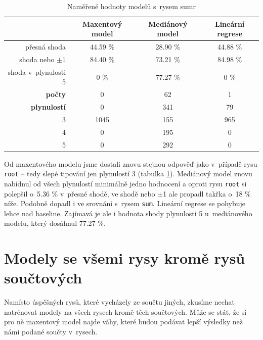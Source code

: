 \documentclass[12pt,a4paper]{report}
\begin{document}
\begin{table}[!htbp]
\begin{center}
\begin{tabular}{|r|c|c|c|}
\hline
 & \textbf{\scriptsize{ Maxentový model}} & \textbf{\scriptsize Mediánový model} & \textbf{\scriptsize Lineární regrese} \\
 \hline
 přesná shoda & 44.59 \%  & 28.90 \%  & 44.88 \% \\
\hline
shoda nebo $\pm$1 & 84.40 \% & 73.21 \%  & 84.98 \% \\
\hline
shoda v~plynulosti 5 & \color{red}0 \% & 77.27 \% & \color{red}0 \% \\
\hline
     \textbf{počty} \quad 1 & \color{red}0   & 62  & 1 \\
\textbf{plynulostí} \quad 2 & \color{red}0 & 341   & 79\\
                          3 & 1045 & 155  & 965\\
                          4 & \color{red}0   & 195 & \color{red}0 \\
                          5 & \color{red}0   & 292 & \color{red}0 \\
\hline
\end{tabular}
\caption{Naměřené hodnoty modelů s~rysem sumr}\label{tb:sumr}
\end{center}
\end{table}

Od maxentového modelu jsme dostali znovu stejnou odpověď jako v~případě rysu \texttt{root} -- tedy slepé tipování jen plynulostí 3 (tabulka \ref{tb:sumr}). Mediánový model znovu nabídnul od všech plynulostí minimálně jedno hodnocení a oproti rysu \texttt{root} si polepšil o~5.36 \% v~přesné shodě, ve shodě nebo $\pm$1 ale propadl takřka o~18 \% níže. Podobně dopadl i ve srovnání s~rysem \texttt{sum}. Lineární regrese se pohybuje lehce nad baseline. Zajímavá je ale i hodnota shody plynulosti 5 u~mediánového modelu, který dosáhnul 77.27 \%.



\section{Modely se všemi rysy kromě rysů součtových}
Namísto úspěšných rysů, které vycházely ze součtu jiných, zkusíme nechat natrénovat modely na všech rysech kromě těch součtových. Může se stát, že si pro ně maxentový model najde váhy, které budou podávat lepší výsledky než námi podané součty v~rysech.
\end{document}
